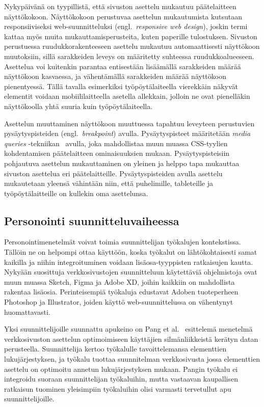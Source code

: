\documentclass[finnish, 12pt, a4paper, elec, utf8, a-1b, online]{aaltothesis}
\begin{document}
Nykypäivänä on tyypillistä, että sivuston asettelu mukautuu päätelaitteen
näyttökokoon. Näyttökokoon perustuvaa asettelun mukautumista kutsutaan
responsiiviseksi web-suunnitteluksi (engl.\ \textit{responsive web design}),
joskin termi kattaa myös muita mukauttamisperusteita, kuten paperille
tulostuksen. Sivuston perustuessa ruudukkorakenteeseen asettelu mukautuu
automaattisesti näyttökoon muutoksiin, sillä sarakkeiden leveys on määritetty
suhteessa ruudukkoalueeseen. Asettelua voi kuitenkin parantaa entisestään
lisäämällä sarakkeiden määrää näyttökoon kasvaessa, ja vähentämällä sarakkeiden
määrää näyttökoon pienentyessä. Tällä tavalla esimerkiksi työpöytälaiteella
vierekkäin näkyvät elementit voidaan mobiililaitteella asetella allekkain,
jolloin ne ovat pienelläkin näyttökoolla yhtä suuria kuin työpöytälaiteella.

Asettelun muuttaminen näyttökoon muuttuessa tapahtuu leveyteen perustuvien
pysäytyspisteiden (engl.\ \textit{breakpoint}) avulla. Pysäytyspisteet
määritetään \textit{media queries} -tekniikan~\cite{Rivoal:12:MQ} avulla, joka
mahdollistaa muun muassa CSS-tyylien kohdentamisen päätelaitteen ominaisuuksien
mukaan. Pysäytyspisteisiin pohjautuva asettelun mukauttaminen on yleinen ja
helppo tapa mukauttaa sivuston asettelua eri päätelaitteille. Pysäytyspisteiden
avulla asettelu mukautetaan yleensä vähintään niin, että puhelimille,
tableteille ja työpöytälaitteille on kullekin oma asettelunsa.

\subsection{Personointi suunnitteluvaiheessa}

Personointimenetelmät voivat toimia suunnittelijan työkalujen kontekstissa.
Tällöin ne on helpompi ottaa käyttöön, koska työkalut on lähtökohtaisesti samat
kaikilla ja niihin integroituminen voidaan lisäosa-tyyppisten ratkaisujen
kautta. Nykyään suosittuja verkkosivustojen suunnitteluun käytettäviä
ohjelmistoja ovat muun muassa Sketch, Figma ja Adobe XD, joihin kaikkiin on
mahdollista rakentaa lisäosia. Perinteisempiä työkaluja edustavat Adoben
tuoteperheen Photoshop ja Illustrator, joiden käyttö web-suunnittelussa on
vähentynyt huomattavasti.

Yksi suunnittelijoille suunnattu apukeino on Pang et al.~\cite{Pang2016}
esittelemä menetelmä verkkosivuston asettelun optimoimiseen käyttäjien
silmänliikkeistä kerätyn datan perusteella. Suunnittelija kertoo työkalulle
tavoittelemansa elementtien lukujärjestyksen, ja työkalu tuottaa suunnitelman
verkkosivusta jossa elementtien asettelu on optimoitu annetun lukujärjestyksen
mukaan. Pangin työkalu ei integroidu suoraan suunnittelijan työkaluihin, mutta
vastaavan kaupallisen ratkaisun tuominen yleisimpiin työkaluihin olisi varmasti
tervetullut apu suunnittelijoille.
\end{document}

